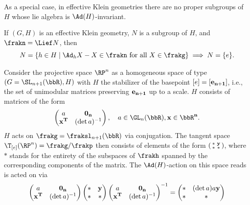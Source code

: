 As a special case, in effective Klein geometries there are no proper subgroups of $H$ whose lie algebra is $\Ad(H)$-invariant.

\begin{cor}\label{Cor 4.2 Sharpe}
    If $(G,H)$ is an effective Klein geometry, $N$ is a subgroup of $H$, and $\frakn=\Lief N$, then
    \[N=\{h\in H\mid \Ad_h X-X\in\frakn \text{ for all }X\in\frakg\}\implies N=\{e\}.\]
\end{cor}

\begin{example}\label{ex real projective Klein model}
    Consider the projective space $\RP^n$ as a homogeneous space of type $(G=\SL_{n+1}(\bbR),H)$ with $H$ the stabilizer of the basepoint $[e]=[\bf{e}_{n+1}]$, i.e., the set of unimodular matrices preserving $\bf{e}_{n+1}$ up to a scale. $H$ consists of matrices of the form 
    \[ \begin{pmatrix}
        a & \bf{0}_n \\
        \bf{x}^T & (\det a)^{-1} 
    \end{pmatrix},\quad a\in \GL_n(\bbR),\bf{x}\in\bbR^n.\]
    $H$ acts on $\frakg=\fraksl_{n+1}(\bbR)$ via conjugation. The tangent space $\T_{[e]}(\RP^n)=\frakg\slash\frakp$ then consists of elements of the form 
    $\left(\begin{smallmatrix}
        \ast & \bf{y} \\
        \ast & \ast
    \end{smallmatrix}\right)$, where $\ast$ stands for the entirety of the subspaces of $\frakh$ spanned by the corresponding components of the matrix. The $\Ad(H)$-action on this space reads 
    is acted on via 
    \[\begin{pmatrix}
        a & \bf{0}_n\\
        \bf{x}^T & (\det a)^{-1}
    \end{pmatrix}
    \begin{pmatrix}
        \ast & \bf{y} \\
        \ast & \ast 
    \end{pmatrix}
    \begin{pmatrix}
        a & \bf{0}_n\\
        \bf{x}^T & (\det a)^{-1}
    \end{pmatrix}^{-1}=
    \begin{pmatrix}
        \ast & (\det a) a\bf{y} \\
        \ast & \ast

\end{pmatrix}\]
\end{example}
